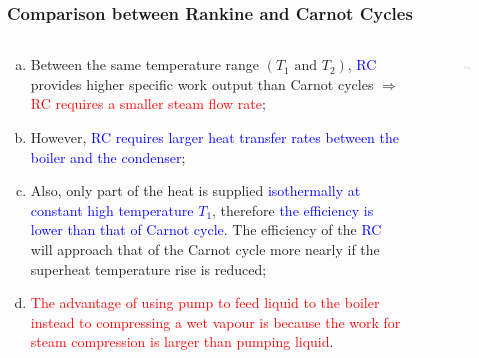 \documentclass[10pt,compress,handout,ignorenonframetext]{beamer}
\newcommand{\red}{\textcolor{red}}
\newcommand{\blue}{\textcolor{blue}}
\begin{document}
\begin{frame}
 \frametitle{Comparison between Rankine and Carnot Cycles}
  \begin{columns}
   \begin{column}[c]{0.4\linewidth}
    \begin{enumerate}[(a)]\scriptsize
     \item<1-> Between the same temperature range $\left(T_{1}\text{ and }T_{2}\right)$, \blue{RC} provides higher specific work output than Carnot cycles $\Longrightarrow$ \red{RC requires a smaller steam flow rate};
     \item<2-> However, \blue{RC requires larger heat transfer rates between the boiler and the condenser};
     \item<3-> Also, only part of the heat is supplied \blue{isothermally at constant high temperature $T_{1}$}, therefore \blue{the efficiency is lower than that of Carnot cycle}. The efficiency of the \blue{RC} will approach that of the Carnot cycle more nearly if the superheat temperature rise is reduced;
     \item<4-> \red{The advantage of using pump to feed liquid to the boiler instead to compressing a wet vapour is because the work for steam compression is larger than pumping liquid}.
    \end{enumerate}
   \end{column}
   \begin{column}[c]{0.6\linewidth}
    \begin{figure}%
     \begin{center}
      \includegraphics[width=7.5cm,clip]{./Pics/Comparison_Rankine_Carnot}
     \end{center}
    \end{figure}  
   \end{column}
  \end{columns}
 \normalsize
\end{frame}
\end{document}
